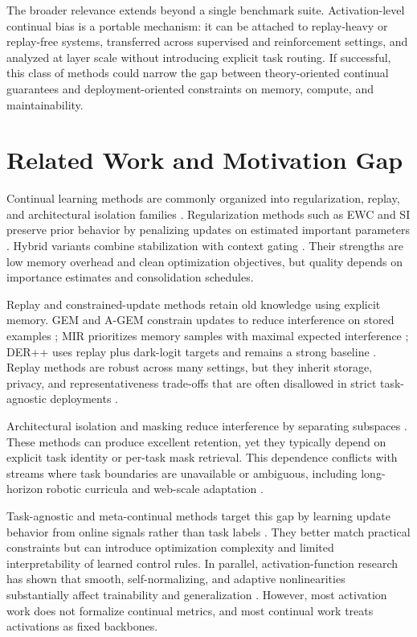 \documentclass{article} %
\begin{document}
The broader relevance extends beyond a single benchmark suite. Activation-level continual bias is a portable mechanism: it can be attached to replay-heavy or replay-free systems, transferred across supervised and reinforcement settings, and analyzed at layer scale without introducing explicit task routing. If successful, this class of methods could narrow the gap between theory-oriented continual guarantees and deployment-oriented constraints on memory, compute, and maintainability.

\section{Related Work and Motivation Gap}
Continual learning methods are commonly organized into regularization, replay, and architectural isolation families \citep{s18}. Regularization methods such as EWC and SI preserve prior behavior by penalizing updates on estimated important parameters \citep{s1,s2}. Hybrid variants combine stabilization with context gating \citep{s10,s38}. Their strengths are low memory overhead and clean optimization objectives, but quality depends on importance estimates and consolidation schedules.

Replay and constrained-update methods retain old knowledge using explicit memory. GEM and A-GEM constrain updates to reduce interference on stored examples \citep{s3,s4}; MIR prioritizes memory samples with maximal expected interference \citep{s13}; DER++ uses replay plus dark-logit targets and remains a strong baseline \citep{s14}. Replay methods are robust across many settings, but they inherit storage, privacy, and representativeness trade-offs that are often disallowed in strict task-agnostic deployments \citep{s30}.

Architectural isolation and masking reduce interference by separating subspaces \citep{s7,s8,s9,s11,s15}. These methods can produce excellent retention, yet they typically depend on explicit task identity or per-task mask retrieval. This dependence conflicts with streams where task boundaries are unavailable or ambiguous, including long-horizon robotic curricula and web-scale adaptation \citep{s28,s33}.

Task-agnostic and meta-continual methods target this gap by learning update behavior from online signals rather than task labels \citep{s12,s19,s29,s37,s39}. They better match practical constraints but can introduce optimization complexity and limited interpretability of learned control rules. In parallel, activation-function research has shown that smooth, self-normalizing, and adaptive nonlinearities substantially affect trainability and generalization \citep{s20,s21,s22,s23,s24,s25,s26,s27}. However, most activation work does not formalize continual metrics, and most continual work treats activations as fixed backbones.
\end{document}
